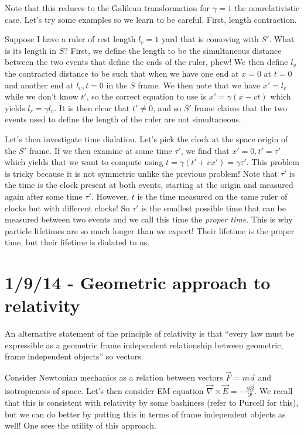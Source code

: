 \documentclass[10pt]{report}
\newcommand{\pd}[2]{\frac{\partial #1}{\partial#2}}
\begin{document}
Note that this reduces to the Galilean transformation for $\gamma = 1$ the nonrelativistic case. Let's try some examples so we learn to be careful. First, length contraction.

Suppose I have a ruler of rest length $l_r = 1$ yard that is comoving with $S'$. What is its length in $S$? First, we define the length to be the simultaneous distance between the two events that define the ends of the ruler, phew! We then define $l_v$ the contracted distance to be such that when we have one end at $x=0$ at $t=0$ and another end at $l_v, t=0$ in the $S$ frame. We then note that we have $x' = l_r$ while we don't know $t'$, so the correct equation to use is $x' = \gamma(x-vt)$ which yields $l_r = \gamma l_v$. It is then clear that $t' \neq 0$, and so $S'$ frame claims that the two events used to define the length of the ruler are not simultaneous.

Let's then investigate time dialation. Let's pick the clock at the space origin of the $S'$ frame. If we then examine at some time $\tau'$, we find that $x' = 0, t' = \tau'$ which yields that we want to compute using $t = \gamma(t' + vx') = \gamma \tau'$. This problem is tricky because it is not symmetric unlike the previous problem! Note that $\tau'$ is the time is the clock present at both events, starting at the origin and measured again after some time $\tau'$. However, $t$ is the time measured on the same ruler of clocks but with different clocks! So $\tau'$ is the smallest possible time that can be measured between two events and we call this time the \emph{proper time}. This is why particle lifetimes are so much longer than we expect! Their lifetime is the proper time, but their lifetime is dialated to us.

\chapter{1/9/14 - Geometric approach to relativity}

An alternative statement of the principle of relativity is that ``every law must be expressible as a geometric frame independent relationship between geometric, frame independent objects'' so vectors.

Consider Newtonian mechanics as a relation between vectors $\vec{F} = m\vec{a}$ and isotropicness of space. Let's then consider EM equation $\vec{\nabla} \times \vec{E} = -\pd{\vec{B}}{t}$. We recall that this is consistent with relativity by some bashiness (refer to Purcell for this), but we can do better by putting this in terms of frame independent objects as well! One sees the utility of this approach.
\end{document}
